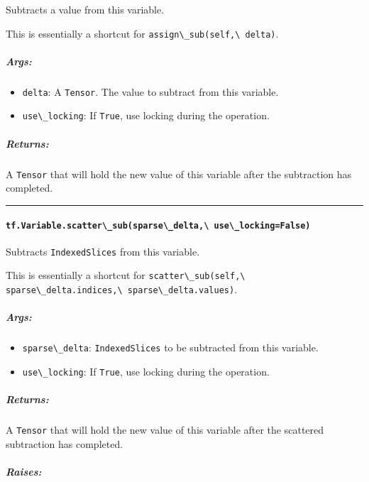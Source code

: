 Subtracts a value from this variable.

This is essentially a shortcut for \lstinline{assign\_sub(self,\ delta)}.

\subparagraph{Args: }\label{args-3}

\begin{itemize}
\tightlist
\item
  \lstinline{delta}: A \lstinline{Tensor}. The value to subtract from this
  variable.
\item
  \lstinline{use\_locking}: If \lstinline{True}, use locking during the
  operation.
\end{itemize}

\subparagraph{Returns: }\label{returns-4}

A \lstinline{Tensor} that will hold the new value of this variable after
the subtraction has completed.

\begin{center}\rule{0.5\linewidth}{\linethickness}\end{center}

\paragraph{\texorpdfstring{\lstinline{tf.Variable.scatter\_sub(sparse\_delta,\ use\_locking=False)}
}{tf.Variable.scatter\_sub(sparse\_delta, use\_locking=False) }}\label{tf.variable.scatterux5fsubsparseux5fdelta-useux5flockingfalse}

Subtracts \lstinline{IndexedSlices} from this variable.

This is essentially a shortcut for
\lstinline{scatter\_sub(self,\ sparse\_delta.indices,\ sparse\_delta.values)}.

\subparagraph{Args: }\label{args-4}

\begin{itemize}
\tightlist
\item
  \lstinline{sparse\_delta}: \lstinline{IndexedSlices} to be subtracted from
  this variable.
\item
  \lstinline{use\_locking}: If \lstinline{True}, use locking during the
  operation.
\end{itemize}

\subparagraph{Returns: }\label{returns-5}

A \lstinline{Tensor} that will hold the new value of this variable after
the scattered subtraction has completed.

\subparagraph{Raises: }\label{raises-1}

